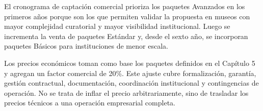 El cronograma de captación comercial prioriza los paquetes Avanzados en los primeros años porque son los que permiten validar la propuesta en museos con mayor complejidad curatorial y mayor visibilidad institucional. Luego se incrementa la venta de paquetes Estándar y, desde el sexto año, se incorporan paquetes Básicos para instituciones de menor escala.

\begin{table}[H]
	\centering
	\scriptsize
	\mqiTableSetup
	\caption[Cronograma de captación del proyecto]{Cronograma de captación comercial del escenario base. Fuente: hoja \texttt{INGRESOS}.}
	\label{tab:cronograma-captacion-proyecto}
\end{table}

Los precios económicos toman como base los paquetes definidos en el Capítulo 5 y agregan un factor comercial de 20\%. Este ajuste cubre formalización, garantía, gestión contractual, documentación, coordinación institucional y contingencias de operación. No se trata de inflar el precio arbitrariamente, sino de trasladar los precios técnicos a una operación empresarial completa.


